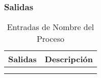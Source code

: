 \subsubsection{Salidas}

\begin{table}[H]
\centering
	\begin{tabular}{p{5cm} p{11cm}}
		\hline
			\textbf{Salidas} & \textbf{Descripción}\\
		\hline
		\hline
			 & 
			\\
		\hline
			& \\
		\hline	
	\end{tabular}
\caption{Entradas de Nombre del Proceso}
\end{table}
